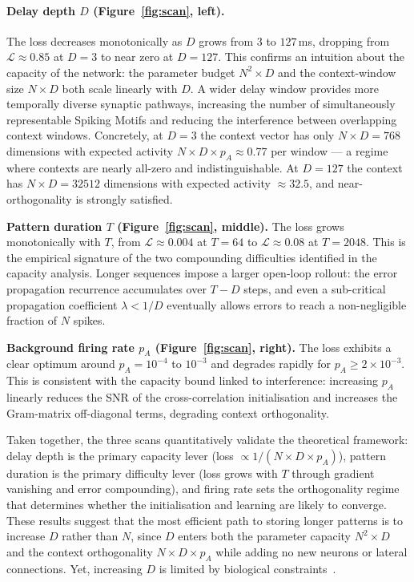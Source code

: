 \documentclass{article}
\begin{document}
\paragraph{Delay depth $D$ (Figure~\ref{fig:scan}, left).} The loss decreases monotonically as $D$ grows from $3$ to $127$\,ms, dropping from $\mathcal{L} \approx 0.85$ at $D = 3$ to near zero at $D = 127$. This confirms an intuition about the capacity of the network: the parameter budget $N^2 \times D$ and the context-window size $N \times D$ both scale linearly with $D$. A wider delay window provides more temporally diverse synaptic pathways, increasing the number of simultaneously representable Spiking Motifs and reducing the interference between overlapping context windows. Concretely, at $D = 3$ the context vector has only $N \times D = 768$ dimensions with expected activity $N \times D  \times p_A \approx 0.77$ per window --- a regime where contexts are nearly all-zero and indistinguishable. At $D = 127$ the context has $N \times D = 32512$ dimensions with expected activity $\approx 32.5$, and near-orthogonality is strongly satisfied.

\textbf{Pattern duration $T$ (Figure~\ref{fig:scan}, middle).} The loss grows monotonically with $T$, from $\mathcal{L} \approx 0.004$ at $T = 64$ to $\mathcal{L} \approx 0.08$ at $T = 2048$. This is the empirical signature of the two compounding difficulties identified in the capacity analysis. Longer sequences impose a larger open-loop rollout: the error propagation recurrence accumulates over $T - D$ steps, and even a sub-critical propagation coefficient $\lambda < 1/D$ eventually allows errors to reach a non-negligible fraction of $N$ spikes. 

\textbf{Background firing rate $p_A$ (Figure~\ref{fig:scan}, right).} The loss exhibits a clear optimum around $p_A = 10^{-4}$ to $10^{-3}$ and degrades rapidly for $p_A \geq 2 \times 10^{-3}$. This is consistent with the capacity bound linked to interference: increasing $p_A$ linearly reduces the SNR of the cross-correlation initialisation and increases the Gram-matrix off-diagonal terms, degrading context orthogonality. 

Taken together, the three scans quantitatively validate the theoretical framework: delay depth is the primary capacity lever (loss $\propto 1/(N \times D \times p_A)$), pattern duration is the primary difficulty lever (loss grows with $T$ through gradient vanishing and error compounding), and firing rate sets the orthogonality regime that determines whether the initialisation and learning are likely to converge. These results suggest that the most efficient path to storing longer patterns is to increase $D$ rather than $N$, since $D$ enters both the parameter capacity $N^2 \times D$ and the context orthogonality $N \times D \times p_A$ while adding no new neurons or lateral connections. Yet, increasing $D$ is limited by biological constraints~\citep{Grimaldi2023}.
\end{document}
